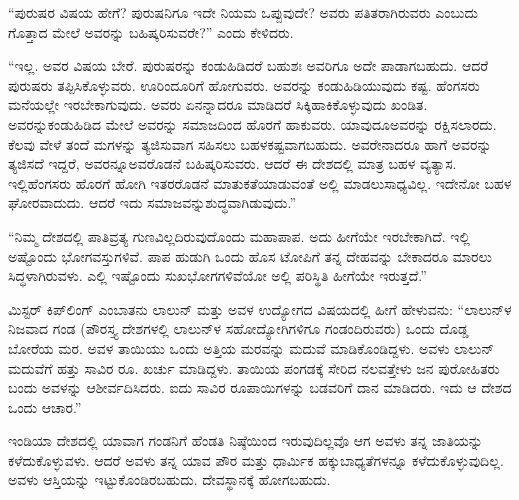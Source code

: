 \vskip 3pt

“ಪುರುಷರ ವಿಷಯ ಹೇಗೆ? ಪುರುಷನಿಗೂ ಇದೇ ನಿಯಮ ಒಪ್ಪುವುದೇ? ಅವರು ಪತಿತರಾಗಿರುವರು ಎಂಬುದು ಗೊತ್ತಾದ ಮೇಲೆ ಅವರನ್ನು ಬಹಿಷ್ಕರಿಸುವರೇ?” ಎಂದು ಕೇಳಿದರು.

\vskip 3pt

“ಇಲ್ಲ. ಅವರ ವಿಷಯ ಬೇರೆ. ಪುರುಷರನ್ನು ಕಂಡುಹಿಡಿದರೆ ಬಹುಶಃ ಅವರಿಗೂ ಅದೇ ಪಾಡಾಗಬಹುದು. ಆದರೆ ಪುರುಷರು ತಪ್ಪಿಸಿಕೊಳ್ಳುವರು. ಊರಿಂದೂರಿಗೆ ಹೋಗುವರು. ಅವರನ್ನು ಕಂಡುಹಿಡಿಯುವುದು ಕಷ್ಟ. ಹೆಂಗಸರು ಮನೆಯಲ್ಲೇ ಇರಬೇಕಾಗುವುದು. ಅವರು ಏನನ್ನಾದರೂ ಮಾಡಿದರೆ ಸಿಕ್ಕಿಹಾಕಿಕೊಳ್ಳುವುದು ಖಂಡಿತ. ಅವರನ್ನು\break ಕಂಡುಹಿಡಿದ ಮೇಲೆ ಅವರನ್ನು ಸಮಾಜದಿಂದ ಹೊರಗೆ ಹಾಕುವರು. ಯಾವುದೂ\break ಅವರನ್ನು ರಕ್ಷಿಸಲಾರದು. ಕೆಲವು ವೇಳೆ ತಂದೆ ಮಗಳನ್ನು ತ್ಯಜಿಸುವಾಗ ಸಹಿಸಲು ಬಹಳ\break ಕಷ್ಟವಾಗಬಹುದು. ಅವರೇನಾದರೂ ಹಾಗೆ ಅವರನ್ನು ತ್ಯಜಿಸದೆ ಇದ್ದರೆ, ಅವರನ್ನೂ\break ಅವರೊಡನೆ ಬಹಿಷ್ಕರಿಸುವರು. ಆದರೆ ಈ ದೇಶದಲ್ಲಿ ಮಾತ್ರ ಬಹಳ ವ್ಯತ್ಯಾಸ. ಇಲ್ಲಿ\break ಹೆಂಗಸರು ಹೊರಗೆ ಹೋಗಿ ಇತರರೊಡನೆ ಮಾತುಕತೆಯಾಡುವಂತೆ ಅಲ್ಲಿ ಮಾಡಲು\break ಸಾಧ್ಯವಿಲ್ಲ. ಇದೇನೋ ಬಹಳ ಘೋರವಾದುದು. ಆದರೆ ಇದು ಸಮಾಜವನ್ನು\break ಶುದ್ಧವಾಗಿಡುವುದು.”

\vskip 3pt

“ನಿಮ್ಮ ದೇಶದಲ್ಲಿ ಪಾತಿವ್ರತ್ಯ ಗುಣವಿಲ್ಲದಿರುವುದೊಂದು ಮಹಾಪಾಪ. ಅದು ಹೀಗೆಯೇ ಇರಬೇಕಾಗಿದೆ. ಇಲ್ಲಿ ಅಷ್ಟೊಂದು ಭೋಗವಸ್ತುಗಳಿವೆ. ಪಾಪ ಹುಡುಗಿ ಒಂದು ಹೊಸ ಟೋಪಿಗೆ ತನ್ನ ದೇಹವನ್ನು ಬೇಕಾದರೂ ಮಾರಲು ಸಿದ್ಧಳಾಗಿರುವಳು. ಎಲ್ಲಿ ಇಷ್ಟೊಂದು ಸುಖಭೋಗಗಳಿವೆಯೋ ಅಲ್ಲಿ ಪರಿಸ್ಥಿತಿ ಹೀಗೆಯೇ ಇರುತ್ತದೆ.”

\vskip 3pt

ಮಿಸ್ಟರ್​ ಕಿಪ್​ಲಿಂಗ್​ ಎಂಬಾತನು ಲಾಲುನ್​ ಮತ್ತು ಅವಳ ಉದ್ಯೋಗದ ವಿಷಯದಲ್ಲಿ ಹೀಗೆ ಹೇಳುವನು: “ಲಾಲುನ್​ಳ ನಿಜವಾದ ಗಂಡ (ಪೌರಸ್ತ್ಯ ದೇಶಗಳಲ್ಲಿ ಲಾಲುನ್​ಳ ಸಹೋದ್ಯೋಗಿಗಳಿಗೂ ಗಂಡಂದಿರುವರು) ಒಂದು ದೊಡ್ಡ ಬೋರೆಯ ಮರ. ಅವಳ ತಾಯಿಯು ಒಂದು ಅತ್ತಿಯ ಮರವನ್ನು ಮದುವೆ ಮಾಡಿಕೊಂಡಿದ್ದಳು. ಅವಳು ಲಾಲುನ್​ ಮದುವೆಗೆ ಹತ್ತು ಸಾವಿರ ರೂ. ಖರ್ಚು ಮಾಡಿದ್ದಳು. ತಾಯಿಯ ಪಂಗಡಕ್ಕೆ ಸೇರಿದ ನಲವತ್ತೇಳು ಜನ ಪುರೋಹಿತರು ಬಂದು ಅವಳನ್ನು ಆಶೀರ್ವದಿಸಿದರು. ಐದು ಸಾವಿರ ರೂಪಾಯಿಗಳನ್ನು ಬಡವರಿಗೆ ದಾನ ಮಾಡಿದರು. ಇದು ಆ ದೇಶದ ಒಂದು ಆಚಾರ.”

\vskip 3pt

ಇಂಡಿಯಾ ದೇಶದಲ್ಲಿ ಯಾವಾಗ ಗಂಡನಿಗೆ ಹೆಂಡತಿ ನಿಷ್ಠೆಯಿಂದ ಇರುವುದಿಲ್ಲವೊ ಆಗ ಅವಳು ತನ್ನ ಜಾತಿಯನ್ನು ಕಳೆದುಕೊಳ್ಳುವಳು. ಆದರೆ ಅವಳು ತನ್ನ ಯಾವ ಪೌರ ಮತ್ತು ಧಾರ್ಮಿಕ ಹಕ್ಕುಬಾಧ್ಯತೆಗಳನ್ನೂ ಕಳೆದುಕೊಳ್ಳುವುದಿಲ್ಲ. ಅವಳು ಆಸ್ತಿಯನ್ನು ಇಟ್ಟುಕೊಂಡಿರಬಹುದು. ದೇವಸ್ಥಾನಕ್ಕೆ ಹೋಗಬಹುದು.

\vskip 3pt

